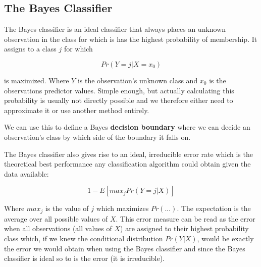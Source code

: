 \subsection{The Bayes Classifier}

The Bayes classifier is an ideal classifier that always places an unknown observation in the class for which is has the highest probability of membership. It assigns to a class $j$ for which

$$ Pr(Y=j|X=x_{0}) $$

is maximized. Where $Y$ is the observation's unknown class and $x_{0}$ is the observations predictor values. Simple enough, but actually calculating this probability is usually not directly possible and we therefore either need to approximate it or use another method entirely.

We can use this to define a Bayes \textbf{decision boundary} where we can decide an observation's class by which side of the boundary it falls on.

The Bayes classifier also gives rise to an ideal, irreducible error rate which is the theoretical best performance any classification algorithm could obtain given the data available:

$$ 1 - E[max_{j} Pr(Y=j|X)] $$

Where $max_{j}$ is the value of $j$ which maximizes $Pr(...)$. The expectation is the average over all possible values of $X$. This error measure can be read as the error when all observations (all values of $X$) are assigned to their highest probability class which, if we knew the conditional distribution $Pr(Y|X)$, would be exactly the error we would obtain when using the Bayes classifier and since the Bayes classifier is ideal so to is the error (it is irreducible).
